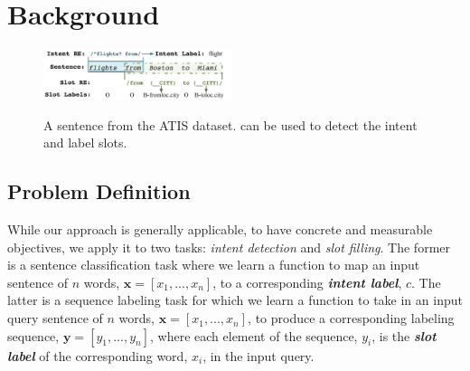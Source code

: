 \section{Background}
\begin{figure}[t!]
  \centering
  \includegraphics[width=0.49\textwidth]{figure/motivation.pdf}\\
  \caption{A sentence from the ATIS dataset. \REs can be used to detect the intent and label slots.}
  \label{atis_sample}
\end{figure}

\subsection{Problem Definition}
While our approach is generally applicable, to have concrete and measurable objectives, we apply it to two \SLU tasks: \emph{intent
detection} and \emph{slot filling}. The former is a sentence classification task where we learn a function to map an input sentence of $n$
words, $\textbf{x}=[x_{1}, ..., x_{n}]$, to a corresponding \textbf{\emph{intent label}}, $c$. The latter is a sequence labeling task for
which we learn a function to take in an input query sentence of $n$ words, $\textbf{x}=[x_{1}, ..., x_{n}]$, to produce a corresponding
labeling sequence, $\textbf{y}=[y_{1}, ..., y_{n}]$, where each element of the sequence, $y_i$, is the \textbf{\emph{slot label}} of the
corresponding word, $x_i$, in the input query.


%

